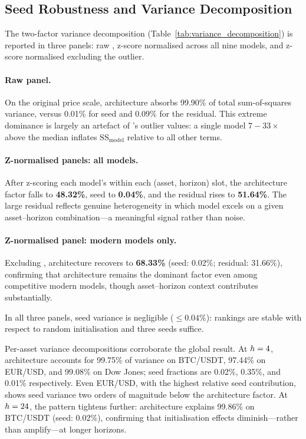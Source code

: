\subsection{Seed Robustness and Variance Decomposition}
\label{sec:seed_robustness}

The two-factor variance decomposition (Table~\ref{tab:variance_decomposition}) is reported in three panels: raw \rmse, z-score normalised \rmse across all nine models, and z-score normalised \rmse excluding the \lstm outlier.



\paragraph{Raw panel.}
On the original price scale, architecture absorbs 99.90\% of total sum-of-squares variance, versus 0.01\% for seed and 0.09\% for the residual.  This extreme dominance is largely an artefact of \lstm's outlier \rmse values: a single model $7{-}33\times$ above the median inflates $\mathrm{SS}_{\text{model}}$ relative to all other terms.

\paragraph{Z-normalised panels: all models.}
After z-scoring each model's \rmse within each (asset, horizon) slot, the architecture factor falls to \textbf{48.32\%}, seed to \textbf{0.04\%}, and the residual rises to \textbf{51.64\%}.  The large residual reflects genuine heterogeneity in which model excels on a given asset--horizon combination---a meaningful signal rather than noise.

\paragraph{Z-normalised panel: modern models only.}
Excluding \lstm, architecture recovers to \textbf{68.33\%} (seed: 0.02\%; residual: 31.66\%), confirming that architecture remains the dominant factor even among competitive modern models, though asset--horizon context contributes substantially.

In all three panels, seed variance is negligible ($\leq 0.04\%$): rankings are stable with respect to random initialisation and three seeds suffice.

Per-asset variance decompositions corroborate the global result.  At $h=4$, architecture accounts for 99.75\% of variance on BTC/USDT, 97.44\% on EUR/USD, and 99.08\% on Dow Jones; seed fractions are 0.02\%, 0.35\%, and 0.01\% respectively.  Even EUR/USD, with the highest relative seed contribution, shows seed variance two orders of magnitude below the architecture factor.  At $h=24$, the pattern tightens further: architecture explains 99.86\% on BTC/USDT (seed: 0.02\%), confirming that initialisation effects diminish---rather than amplify---at longer horizons.

